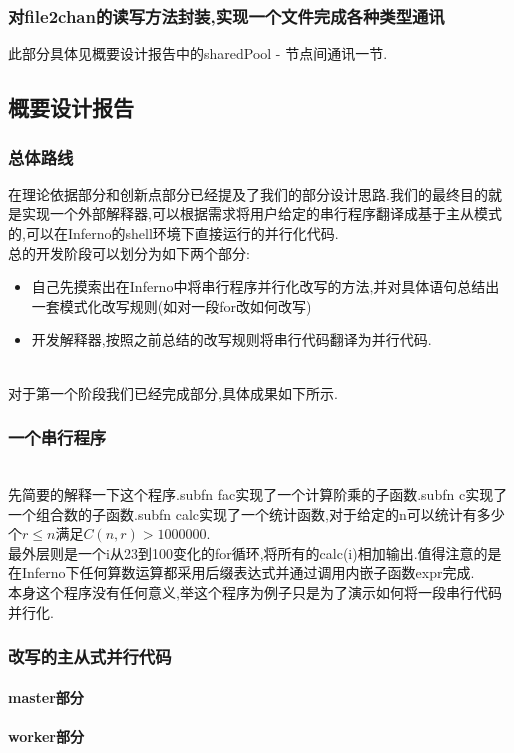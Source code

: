 \documentclass[paper=a4]{ctexart} %
\numberwithin{equation}{section} %
\numberwithin{figure}{section} %
\numberwithin{table}{section} %
\newcommand{\n}{\\\indent}
\begin{document}
\subsubsection{对file2chan的读写方法封装,实现一个文件完成各种类型通讯}
此部分具体见概要设计报告中的sharedPool - 节点间通讯一节. 
\subsection{概要设计报告}

\subsubsection{总体路线}
在理论依据部分和创新点部分已经提及了我们的部分设计思路.我们的最终目的就是实现一个外部解释器,可以根据需求将用户给定的串行程序翻译成基于主从模式的,可以在Inferno的shell环境下直接运行的并行化代码. \n
总的开发阶段可以划分为如下两个部分:
\begin{itemize}
\item 自己先摸索出在Inferno中将串行程序并行化改写的方法,并对具体语句总结出一套模式化改写规则(如对一段for改如何改写)
\item 开发解释器,按照之前总结的改写规则将串行代码翻译为并行代码.
\end{itemize}
~\n
对于第一个阶段我们已经完成部分,具体成果如下所示.

\subsubsection{一个串行程序}

~\n
先简要的解释一下这个程序.subfn fac实现了一个计算阶乘的子函数.subfn c实现了一个组合数的子函数.subfn calc实现了一个统计函数,对于给定的n可以统计有多少个$r\leq n$满足$C(n,r) > 1000000$.\n
最外层则是一个i从23到100变化的for循环,将所有的calc(i)相加输出.值得注意的是在Inferno下任何算数运算都采用后缀表达式并通过调用内嵌子函数expr完成.\n
本身这个程序没有任何意义,举这个程序为例子只是为了演示如何将一段串行代码并行化.

\subsubsection{改写的主从式并行代码}
\paragraph{master部分}

\paragraph{worker部分}
  
\end{document}
